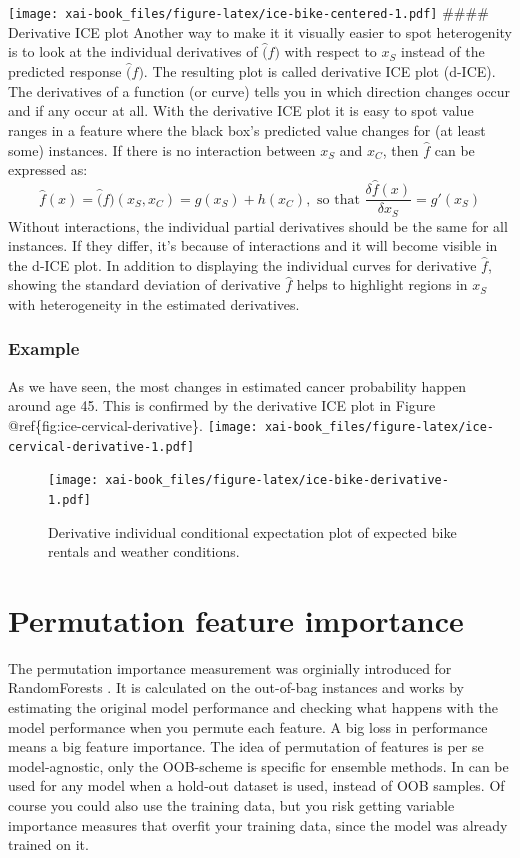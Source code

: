\documentclass[12pt,]{krantz}
\theoremstyle{definition}
\theoremstyle{definition}
\theoremstyle{definition}
\theoremstyle{remark}
\begin{document}
\texttt{[image: xai-book\_files/figure-latex/ice-bike-centered-1.pdf]}
\#\#\#\# Derivative ICE plot Another way to make it it visually easier
to spot heterogenity is to look at the individual derivatives of
\(\hat(f)\) with respect to \(x_S\) instead of the predicted response
\(\hat(f)\). The resulting plot is called derivative ICE plot (d-ICE).
The derivatives of a function (or curve) tells you in which direction
changes occur and if any occur at all. With the derivative ICE plot it
is easy to spot value ranges in a feature where the black box's
predicted value changes for (at least some) instances. If there is no
interaction between \(x_S\) and \(x_C\), then \(\hat{f}\) can be
expressed as:
\[\hat{f}(x) = \hat(f)(x_S, x_C) = g(x_S) + h(x_C), \text{ so that } \frac{\delta\hat{f}(x)}{\delta x_S} = g'(x_S)\]
Without interactions, the individual partial derivatives should be the
same for all instances. If they differ, it's because of interactions and
it will become visible in the d-ICE plot. In addition to displaying the
individual curves for derivative \(\hat{f}\), showing the standard
deviation of derivative \(\hat{f}\) helps to highlight regions in
\(x_S\) with heterogeneity in the estimated derivatives.

\citep{goldstein2015peeking}

\subsubsection{Example}\label{example-2}

As we have seen, the most changes in estimated cancer probability happen
around age 45. This is confirmed by the derivative ICE plot in Figure
@ref\{fig:ice-cervical-derivative\}.
\texttt{[image: xai-book\_files/figure-latex/ice-cervical-derivative-1.pdf]}

\begin{figure}
\centering
\texttt{[image: xai-book\_files/figure-latex/ice-bike-derivative-1.pdf]}
\caption{\label{fig:ice-bike-derivative}Derivative individual conditional
expectation plot of expected bike rentals and weather conditions.}
\end{figure}

\section{Permutation feature
importance}\label{permutation-feature-importance}

The permutation importance measurement was orginially introduced for
RandomForests \citep{breiman2001random}. It is calculated on the
out-of-bag instances and works by estimating the original model
performance and checking what happens with the model performance when
you permute each feature. A big loss in performance means a big feature
importance. The idea of permutation of features is per se
model-agnostic, only the OOB-scheme is specific for ensemble methods. In
can be used for any model when a hold-out dataset is used, instead of
OOB samples. Of course you could also use the training data, but you
risk getting variable importance measures that overfit your training
data, since the model was already trained on it.
\end{document}
